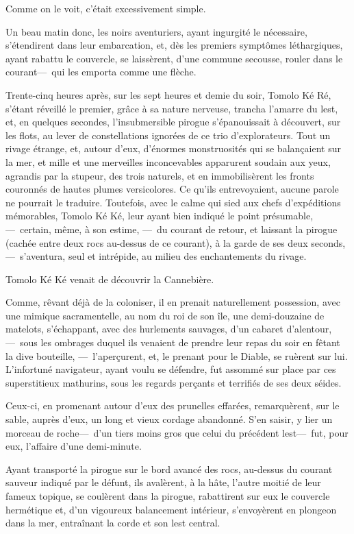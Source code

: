 \documentclass[french,twoside]{book} %
\begin{document}
   Comme on le voit, c’était excessivement simple.\par
Un beau matin donc, les noirs aventuriers, ayant ingurgité le nécessaire, s’étendirent dans leur embarcation, et, dès les premiers symptômes léthargiques, ayant rabattu le couvercle, se laissèrent, d’une commune secousse, rouler dans le courant— qui les emporta comme une flèche.\par
Trente-cinq heures après, sur les sept heures et demie du soir, Tomolo Ké Ré, s’étant réveillé le premier, grâce à sa nature nerveuse, trancha l’amarre du lest, et, en quelques secondes, l’insubmersible pirogue s’épanouissait à découvert, sur les flots, au lever de constellations ignorées de ce trio d’explorateurs. Tout un rivage étrange, et, autour d’eux, d’énormes monstruosités qui se balançaient sur la mer, et mille et une merveilles inconcevables apparurent soudain aux yeux, agrandis par la stupeur, des trois naturels, et en immobilisèrent les fronts couronnés de hautes plumes versicolores. Ce qu’ils entrevoyaient, aucune parole ne pourrait   le traduire. Toutefois, avec le calme qui sied aux chefs d’expéditions mémorables, Tomolo Ké Ké, leur ayant bien indiqué le point présumable, — certain, même, à son estime, — du courant de retour, et laissant la pirogue (cachée entre deux rocs au-dessus de ce courant), à la garde de ses deux seconds, — s’aventura, seul et intrépide, au milieu des enchantements du rivage.\par
Tomolo Ké Ké venait de découvrir la Cannebière.\par
Comme, rêvant déjà de la coloniser, il en prenait naturellement possession, avec une mimique sacramentelle, au nom du roi de son île, une demi-douzaine de matelots, s’échappant, avec des hurlements sauvages, d’un cabaret d’alentour, — sous les ombrages duquel ils venaient de prendre leur repas du soir en fêtant la dive bouteille, — l’aperçurent, et, le prenant pour le Diable, se ruèrent sur lui. L’infortuné navigateur, ayant voulu se défendre, fut assommé sur place par ces superstitieux mathurins, sous les regards perçants et terrifiés de ses deux séides.\par
   Ceux-ci, en promenant autour d’eux des prunelles effarées, remarquèrent, sur le sable, auprès d’eux, un long et vieux cordage abandonné. S’en saisir, y lier un morceau de roche— d’un tiers moins gros que celui du précédent lest— fut, pour eux, l’affaire d’une demi-minute.\par
Ayant transporté la pirogue sur le bord avancé des rocs, au-dessus du courant sauveur indiqué par le défunt, ils avalèrent, à la hâte, l’autre moitié de leur fameux topique, se coulèrent dans la pirogue, rabattirent sur eux le couvercle hermétique et, d’un vigoureux balancement intérieur, s’envoyèrent en plongeon dans la mer, entraînant la corde et son lest central.\par
\end{document}
